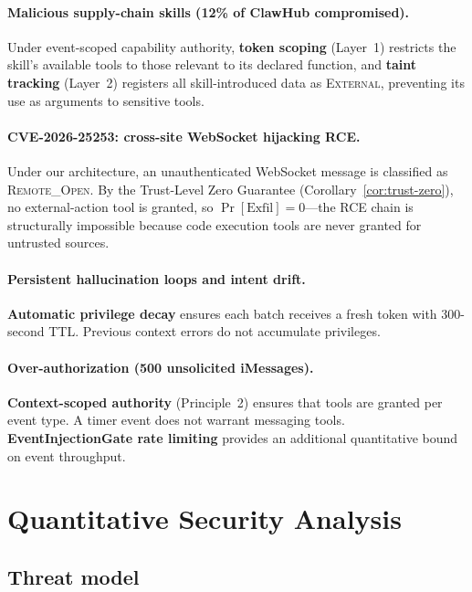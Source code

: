 \documentclass[pdflatex,sn-nature]{sn-jnl}%
\theoremstyle{thmstyleone}%
\theoremstyle{thmstyletwo}%
\theoremstyle{thmstylethree}%
\begin{document}
\paragraph{Malicious supply-chain skills (12\% of ClawHub compromised).} Under event-scoped capability authority, \textbf{token scoping} (Layer~1) restricts the skill's available tools to those relevant to its declared function, and \textbf{taint tracking} (Layer~2) registers all skill-introduced data as \textsc{External}, preventing its use as arguments to sensitive tools.

\paragraph{CVE-2026-25253: cross-site WebSocket hijacking RCE.} Under our architecture, an unauthenticated WebSocket message is classified as \textsc{Remote\_Open}. By the Trust-Level Zero Guarantee (Corollary~\ref{cor:trust-zero}), no external-action tool is granted, so $\Pr[\text{Exfil}] = 0$---the RCE chain is structurally impossible because code execution tools are never granted for untrusted sources.

\paragraph{Persistent hallucination loops and intent drift.} \textbf{Automatic privilege decay} ensures each batch receives a fresh token with 300-second TTL. Previous context errors do not accumulate privileges.

\paragraph{Over-authorization (500 unsolicited iMessages).} \textbf{Context-scoped authority} (Principle~2) ensures that tools are granted per event type. A timer event does not warrant messaging tools. \textbf{EventInjectionGate rate limiting} provides an additional quantitative bound on event throughput.

\section{Quantitative Security Analysis}\label{sec:quant}

\subsection{Threat model}\label{subsec:threat}
\end{document}
